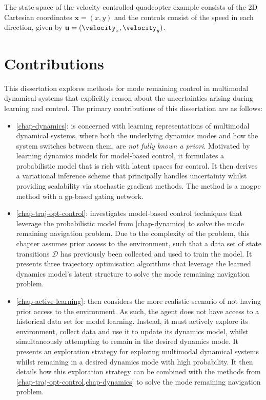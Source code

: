 \documentclass{mimosis-class/mimosis}
\numberwithin{equation}{chapter}
\newcommand{\state}{\ensuremath{\mathbf{x}}}
\newcommand{\control}{\ensuremath{\mathbf{u}}}
\begin{document}
The state-space of the velocity controlled quadcopter example consists of the 2D Cartesian coordinates \(\state = (x, y)\)
and the controls consist of the speed in each direction, given by \(\control = (\velocity_x, \velocity_y)\).

\section{Contributions}
\label{sec:org661c1c0}
This dissertation explores methods for mode remaining control in multimodal dynamical systems that explicitly reason
about the uncertainties arising during learning and control.
The primary contributions of this dissertation are as follows:
\begin{itemize}
\item \cref{chap-dynamics}: is concerned with learning representations of multimodal dynamical
systems, where both the underlying dynamics modes and how the system switches between them, are \emph{not fully known a priori}.
Motivated by learning dynamics models for model-based control, it formulates a probabilistic model that is
rich with latent spaces for control.
It then derives a variational inference scheme that principally handles uncertainty whilst providing scalability
via stochastic gradient methods.
The method is a \acrfull{mogpe} method with a \acrfull{gp}-based gating network.
\item \cref{chap-traj-opt-control}: investigates model-based control techniques that leverage the probabilistic model
from \cref{chap-dynamics} to solve the mode remaining navigation problem.
Due to the complexity of the problem, this chapter
assumes prior access to the environment, such that a data set of state transitions \(\mathcal{D}\) has
previously been collected and used to train the model. It presents three trajectory optimisation algorithms that
leverage the learned dynamics model's latent structure to solve the mode remaining navigation problem.
\item \cref{chap-active-learning}: then considers the more realistic scenario of not having prior access
to the environment. As such, the agent does not have access to a historical data set for model learning.
Instead, it must actively explore its environment, collect data and use it to update its dynamics model,
whilst simultaneously attempting to remain in the desired dynamics mode.
It presents an exploration strategy for exploring multimodal dynamical systems whilst remaining in a
desired dynamics mode with high probability.
It then details how this exploration strategy can be combined with the methods from
\cref{chap-traj-opt-control,chap-dynamics} to solve the mode remaining navigation problem.
\end{itemize}
\end{document}
